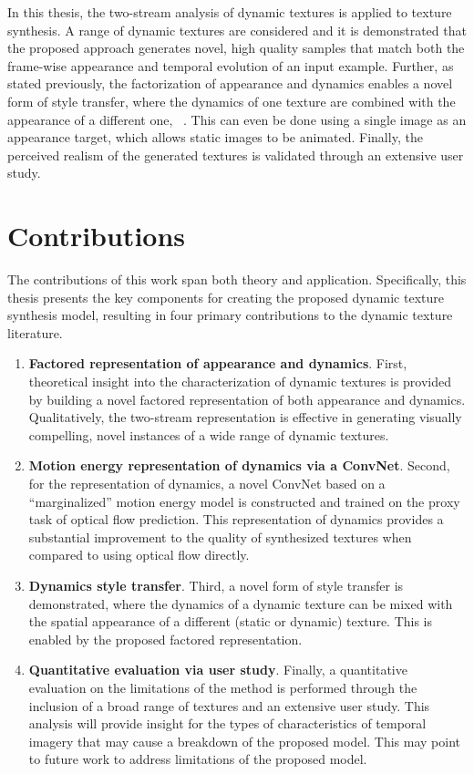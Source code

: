 In this thesis, the two-stream analysis of
dynamic textures is applied to texture synthesis.
A range of dynamic textures are considered and it is demonstrated that the 
proposed approach generates novel, high quality samples that match
both the frame-wise appearance and temporal evolution of an input
example.
Further, as stated previously, the factorization of appearance and dynamics enables a 
novel form of style transfer, where the dynamics of one texture are 
combined with the appearance of a different one,
\cf\ \cite{gatys2016image}.
This can even be done using a single image as an appearance
target, which allows static images to be animated.
Finally, the perceived realism of the generated textures is validated
through an extensive user study.

\section{Contributions}

The contributions of this work span both theory and application. Specifically, this thesis presents the key components for creating the proposed dynamic texture synthesis model, resulting in four primary contributions to the dynamic texture literature.

\begin{enumerate}
	\item \textbf{Factored representation of appearance and dynamics}. First, theoretical insight into the characterization of dynamic textures is provided by building a novel factored representation of both appearance and dynamics. Qualitatively, the two-stream representation is effective in generating visually compelling, novel instances of a wide range of dynamic textures.
	\item \textbf{Motion energy representation of dynamics via a ConvNet}. Second, for the representation of dynamics, a novel ConvNet based on a ``marginalized'' motion energy model \cite{derpanis2010role,derpanis2012spacetime} is constructed and trained on the proxy task of optical flow prediction. This representation of dynamics provides a substantial improvement to the quality of synthesized textures when compared to using optical flow directly.
	\item \textbf{Dynamics style transfer}. Third, a novel form of style transfer is demonstrated, where the dynamics of a dynamic texture can be mixed with the spatial appearance of a different (static or dynamic) texture. This is enabled by the proposed factored representation.
	\item \textbf{Quantitative evaluation via user study}. Finally, a quantitative evaluation on the limitations of the method is performed through the inclusion of a broad range of textures and an extensive user study. This analysis will provide insight for the types of characteristics of temporal imagery that may cause a breakdown of the proposed model. This may point to future work to address limitations of the proposed model.
\end{enumerate}